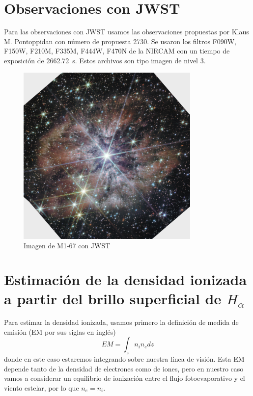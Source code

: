 \documentclass{book}
\begin{document}
\section{Observaciones con JWST}

Para las observaciones con JWST usamos las observaciones propuestas por Klaus M. Pontoppidan con número de propuesta 2730. Se usaron los filtros F090W, F150W, F210M, F335M, F444W, F470N de la NIRCAM con un tiempo de exposición de \SI{2662.72}{s}. Estos archivos son tipo imagen de nivel 3.


\begin{figure}[h]
    \centering
    \includegraphics[width=0.8\textwidth]{M1-67-JWST.jpg}
    \caption{Imagen de M1-67 con JWST}
    \label{fig:M1-67JWST}
\end{figure}

\section{Estimación de la densidad ionizada a partir del brillo superficial de $H_\alpha$}

Para estimar la densidad ionizada, usamos primero la definición de medida de emisión (EM por sus siglas en inglés)
\[EM=\int_z n_i n_edz\] donde en este caso estaremos integrando sobre nuestra línea de visión. Esta EM depende tanto de la densidad de electrones como de iones, pero en nuestro caso vamos a considerar un equilibrio de ionización entre el flujo fotoevaporativo y el viento estelar, por lo que $n_e=n_i$.
\end{document}
